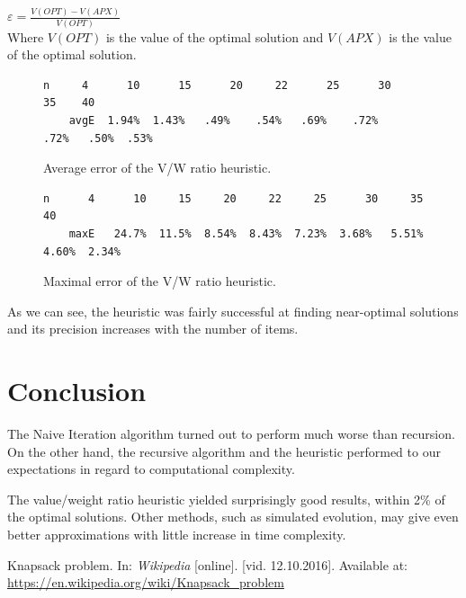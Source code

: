 \documentclass[a4paper,10pt,twocolumn]{article}
\begin{document}
$\varepsilon = \frac{V(OPT)-V(APX)}{V(OPT)}$ \\

Where $V(OPT)$ is the value of the optimal solution and $V(APX)$ is the value of the optimal solution.

\begin{figure}[H]
    \begin{lstlisting}[basicstyle=\scriptsize]
    n     4      10      15      20     22      25      30     35    40
    avgE  1.94%  1.43%   .49%    .54%   .69%    .72%    .72%   .50%  .53%
    \end{lstlisting}
    \caption{Average error of the V/W ratio heuristic.}\label{vwratioavgerr}
\end{figure}

\begin{figure}[H]
    \begin{lstlisting}[basicstyle=\scriptsize]
    n      4      10     15     20     22     25      30     35     40
    maxE   24.7%  11.5%  8.54%  8.43%  7.23%  3.68%   5.51%  4.60%  2.34%
    \end{lstlisting}
    \caption{Maximal error of the V/W ratio heuristic.}\label{vwratiomaxerr}
\end{figure}

As we can see, the heuristic was fairly successful at finding near-optimal solutions and its precision increases with
the number of items.


\section{Conclusion} %
The Naive Iteration algorithm turned out to perform much worse than recursion. On the other hand, the recursive
algorithm and the heuristic performed to our expectations in regard to computational complexity.

The value/weight ratio heuristic yielded surprisingly good results, within 2\% of the optimal solutions. Other methods,
such as simulated evolution, may give even better approximations with little increase in time complexity.

\begin{thebibliography}{9}
        Knapsack problem.
        In: \textit {Wikipedia} [online].
        [vid. 12.10.2016]. Available at:
        \url{https://en.wikipedia.org/wiki/Knapsack_problem}
\end{thebibliography}
\end{document}
